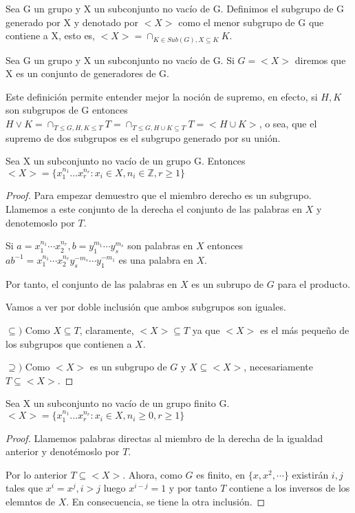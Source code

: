 \begin{definition}
Sea G un grupo y X un subconjunto no vacío de G. Definimos el subgrupo de G generado por X y denotado por $<X>$ como el menor subgrupo de G que contiene a X, esto es, 
$<X> = \cap_{K \in Sub(G),X \subseteq K} K$.
\end{definition}

\begin{definition}
Sea G un grupo y X un subconjunto no vacío de G. Si $G = <X>$ diremos que X es un conjunto de generadores de G.
\end{definition}

Este definición permite entender mejor la noción de supremo, en efecto, si $H,K$ son subgrupos de G entonces $H \lor K = \cap_{T \le G, H,K \le T} T = \cap_{T \le G, H \cup K \subseteq T} T = <H \cup K>$, o sea, que el supremo de dos subgrupos es el subgrupo generado por su unión.

\begin{proposition}
Sea X un subconjunto no vacío de un grupo G. Entonces $<X> = \{x_1^{n_1}...x_r^{n_r}:x_i \in X,n_i \in \mathbb{Z},r \ge 1\}$
\end{proposition}
\begin{proof}
Para empezar demuestro que el miembro derecho es un subgrupo. Llamemos a este conjunto de la derecha el conjunto de las palabras en $X$ y denotemoslo por $T$. 

Si $a = x_1^{n_1} \cdots x_2^{n_r}, b = y_1^{m_1} \cdots y_s^{m_s}$ son palabras en $X$ entonces $ab^{-1} =  x_1^{n_1} \cdots x_2^{n_r}y_s^{-m_s} \cdots y_1^{-m_1}$ es una palabra en $X$. 

Por tanto, el conjunto de las palabras en $X$ es un subrupo de $G$ para el producto. 

Vamos a ver por doble inclusión que ambos subgrupos son iguales. 

$\subseteq)$ Como $X \subseteq T$, claramente, $<X> \subseteq T$ ya que $<X>$ es el más pequeño de los subgrupos que contienen a $X$. 

$\supseteq)$ Como $<X>$ es un subgrupo de $G$ y $X \subseteq <X>$, necesariamente $T \subseteq <X>$. 
\end{proof}

\begin{proposition}
Sea X un subconjunto no vacío de un grupo finito G. $<X> = \{x_1^{n_1}...x_r^{n_r}:x_i \in X,n_i \ge 0,r \ge 1\}$
\end{proposition}
\begin{proof}
Llamemos palabras directas al miembro de la derecha de la igualdad anterior y denotémoslo por $T$. 

Por lo anterior $T \subseteq <X>$. Ahora, como $G$ es finito, en $\{x,x^2,\cdots\}$ existirán $i,j$ tales que $x^i = x^j, i > j$ luego $x^{i-j} = 1$ y por tanto $T$ contiene a los inversos de los elemntos de $X$. En consecuencia, se tiene la otra inclusión.
\end{proof}

